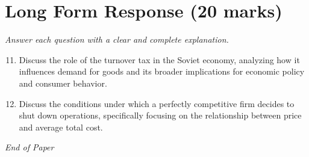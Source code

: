 \documentclass[12pt]{article}
\begin{document}
\section*{Long Form Response (20 marks)}
\textit{Answer each question with a clear and complete explanation.}
\begin{enumerate}[label=\arabic*.]
\setcounter{enumi}{10}
\item Discuss the role of the turnover tax in the Soviet economy, analyzing how it influences demand for goods and its broader implications for economic policy and consumer behavior.
\item Discuss the conditions under which a perfectly competitive firm decides to shut down operations, specifically focusing on the relationship between price and average total cost.
\end{enumerate}

\vfill
\noindent\textit{End of Paper}
\end{document}
